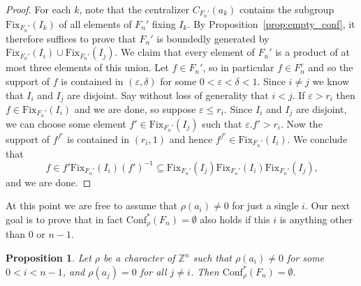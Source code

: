 \documentclass[10pt,a4paper]{article}
\newtheorem{prop}[cdrthm]{Proposition}
\theoremstyle{definition}
\theoremstyle{remark}
\newcommand{\Z}{\mathbb{Z}}
\newcommand{\Fix}{\mathrm{Fix}}
\newcommand{\Conf}{\mathrm{Conf}}
\theoremstyle{plain}
\begin{document}
\begin{proof}
For each $k$, note that the centralizer $C_{F_n'}(a_k)$ contains the subgroup $\Fix_{F_n'}(I_k)$ of all elements of $F_n'$ fixing $I_k$. By Proposition~\ref{prop:empty_conf}, it therefore suffices to prove that $F_n'$ is boundedly generated by $\Fix_{F_n'}(I_i)\cup \Fix_{F_n'}(I_j)$. We claim that every element of $F_n'$ is a product of at most three elements of this union.
Let $f\in F_n'$, so in particular $f \in F_n^c$ and so the support of $f$ is contained in $(\varepsilon,\delta)$ for some $0<\varepsilon<\delta<1$. Since $i\ne j$ we know that $I_i$ and $I_j$ are disjoint. Say without loss of generality that $i<j$. If $\varepsilon>r_i$ then $f\in \Fix_{F_n'}(I_i)$ and we are done, so suppose $\varepsilon\le r_i$. Since $I_i$ and $I_j$ are disjoint, we can choose some element $f'\in \Fix_{F_n'}(I_j)$ such that $\varepsilon.f'>r_i$. Now the support of $f^{f'}$ is contained in $(r_i,1)$ and hence $f^{f'}\in\Fix_{F_n'}(I_i)$. We conclude that
\[
f\in f'\Fix_{F_n'}(I_i)(f')^{-1} \subseteq \Fix_{F_n'}(I_j)\Fix_{F_n'}(I_i)\Fix_{F_n'}(I_j)\text{,}
\] and we are done.
\end{proof}

At this point we are free to assume that $\rho(a_i)\ne 0$ for just a single $i$. Our next goal is to prove that in fact $\Conf^\ast_\rho(F_n)=\emptyset$ also holds if this $i$ is anything other than $0$ or $n-1$.

\begin{prop}\label{prop:middle_empty_conf}
Let $\rho$ be a character of $\Z^n$ such that $\rho(a_i)\ne 0$ for some $0<i<n-1$, and $\rho(a_j)=0$ for all $j\ne i$. Then $\Conf^\ast_\rho(F_n)=\emptyset$.
\end{prop}
\end{document}
